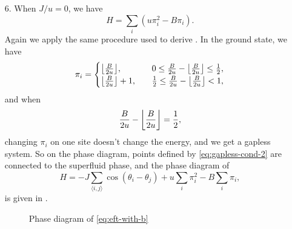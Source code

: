 \documentclass[hyperref, a4paper]{article}
\DeclarePairedDelimiter\floor{\lfloor}{\rfloor}
\newcommand*{\pair}[1]{\langle #1 \rangle}
\begin{document}
\begin{itemize}
\item[6.] When $J / u = 0$, we have
\begin{equation}
    H = \sum_i (u \pi_i^2 - B \pi_i).
\end{equation}
Again we apply the same procedure used to derive .
In the ground state, we have 
\begin{equation}
    \pi_i = \begin{cases}
        \floor*{\frac{B}{2u}}, \quad & 0 \leq \frac{B}{2u} - \floor*{\frac{B}{2u}} \leq \frac{1}{2}, \\
        \floor*{\frac{B}{2u}} + 1, \quad & \frac{1}{2} \leq \frac{B}{2u} - \floor*{\frac{B}{2u}} < 1, \\
    \end{cases}
\end{equation}
and when 
\begin{equation}
    \frac{B}{2u} - \floor*{\frac{B}{2u}} = \frac{1}{2},
    \label{eq:gapless-cond-2}
\end{equation}
changing $\pi_i$ on one site doesn't change the energy,
and we get a gapless system.
So on the phase diagram, points defined by \eqref{eq:gapless-cond-2} are connected to the superfluid phase,
and the phase diagram of 
\begin{equation}
    H = - J \sum_{\pair{i, j}} \cos(\theta_i - \theta_j) 
    + u \sum_i \pi_i^2 - B \sum_i \pi_i , 
    \label{eq:eft-with-b}
\end{equation}
is given in .

\begin{figure}
    \centering
    
    \caption{Phase diagram of \eqref{eq:eft-with-b}}
    \label{fig:phase-eft-b}
\end{figure}


\end{itemize}
\end{document}
